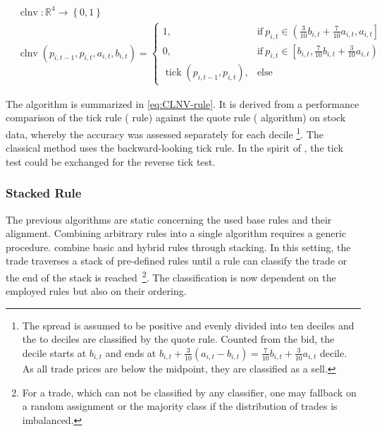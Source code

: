 \begin{equation}
  \begin{aligned}
     & \operatorname{clnv} \colon \mathbb{R}^4 \to \left\{0, 1 \right\} \\
     & \operatorname{clnv}(p_{i, t-1}, p_{i, t}, a_{i, t}, b_{i, t})=
    \begin{cases}
      1,                                         & \text{if}\ p_{i, t} \in \left(\frac{3}{10} b_{i,t} + \frac{7}{10} a_{i,t}, a_{i, t}\right] \\
      0,                                         & \text{if}\ p_{i, t} \in \left[ b_{i,t}, \frac{7}{10} b_{i,t} + \frac{3}{10} a_{i,t}\right) \\
      \operatorname{tick}(p_{i, t-1}, p_{i, t}), & \text{else}
    \end{cases}
  \end{aligned}
  \label{eq:CLNV-rule}
\end{equation}

The algorithm is summarized in \cref{eq:CLNV-rule}. It is derived from a performance comparison of the tick rule ( rule) against the quote rule ( algorithm) on stock data, whereby the accuracy was assessed separately for each decile \footnote{The spread is assumed to be positive and evenly divided into ten deciles and the  to  deciles are classified by the quote rule. Counted from the bid, the  decile starts at $b_{i,t}$ and ends at $b_{i,t} + \tfrac{3}{10} (a_{i,t} - b_{i,t}) = \tfrac{7}{10} b_{i,t} + \tfrac{3}{10} a_{i,t}$  decile. As all trade prices are below the midpoint, they are classified as a sell.}. The classical  method uses the backward-looking tick rule. In the spirit of \textcite[][735]{leeInferringTradeDirection1991}, the tick test could be exchanged for the reverse tick test.

\subsubsection{Stacked Rule}\label{sec:stacked-rule}

The previous algorithms are static concerning the used base rules and their alignment. Combining arbitrary rules into a single algorithm requires a generic procedure. \textcite[][18]{grauerOptionTradeClassification2022} combine basic and hybrid rules through stacking. In this setting, the trade traverses a stack of pre-defined rules until a rule can classify the trade or the end of the stack is reached~\footnote{For a trade, which can not be classified by any classifier, one may fallback on a random assignment or the majority class if the distribution of trades is imbalanced.}. The classification is now dependent on the employed rules but also on their ordering.


